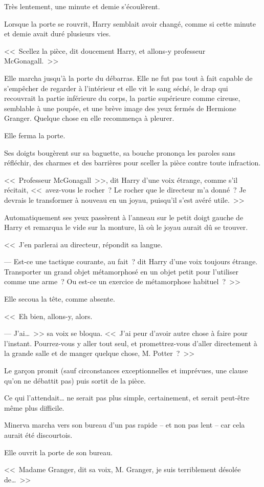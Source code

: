 Très lentement, une minute et demie s'écoulèrent.

\later

Lorsque la porte se rouvrit, Harry semblait avoir changé, comme si cette minute et demie avait duré plusieurs vies.

<<~Scellez la pièce, dit doucement Harry, et allons-y professeur McGonagall.~>>

Elle marcha jusqu'à la porte du débarras. Elle ne fut pas tout à fait capable de s'empêcher de regarder à l'intérieur et elle vit le sang séché, le drap qui recouvrait la partie inférieure du corps, la partie supérieure comme cireuse, semblable à une poupée, et une brève image des yeux fermés de Hermione Granger. Quelque chose en elle recommença à pleurer.

Elle ferma la porte.

Ses doigts bougèrent sur sa baguette, sa bouche prononça les paroles sans réfléchir, des charmes et des barrières pour sceller la pièce contre toute infraction.

<<~Professeur McGonagall~>>, dit Harry d'une voix étrange, comme s'il récitait, <<~avez-vous le rocher~? Le rocher que le directeur m'a donné~? Je devrais le transformer à nouveau en un joyau, puisqu'il s'est avéré utile.~>>

Automatiquement ses yeux passèrent à l'anneau sur le petit doigt gauche de Harry et remarqua le vide sur la monture, là où le joyau aurait dû se trouver.

<<~J'en parlerai au directeur, répondit sa langue.

--- Est-ce une tactique courante, au fait~? dit Harry d'une voix toujours étrange. Transporter un grand objet métamorphosé en un objet petit pour l'utiliser comme une arme~? Ou est-ce un exercice de métamorphose habituel~?~>>

Elle secoua la tête, comme absente.

<<~Eh bien, allons-y, alors.

--- J'ai…~>> sa voix se bloqua. <<~J'ai peur d'avoir autre chose à faire pour l'instant. Pourrez-vous y aller tout seul, et promettrez-vous d'aller directement à la grande salle et de manger quelque chose, M. Potter~?~>>

Le garçon promit (sauf circonstances exceptionnelles et imprévues, une clause qu'on ne débattit pas) puis sortit de la pièce.

Ce qui l'attendait… ne serait pas plus simple, certainement, et serait peut-être même plus difficile.

\later

Minerva marcha vers son bureau d'un pas rapide -- et non pas lent -- car cela aurait été discourtois.

Elle ouvrit la porte de son bureau.

<<~Madame Granger, dit sa voix, M. Granger, je suis terriblement désolée de…~>>
